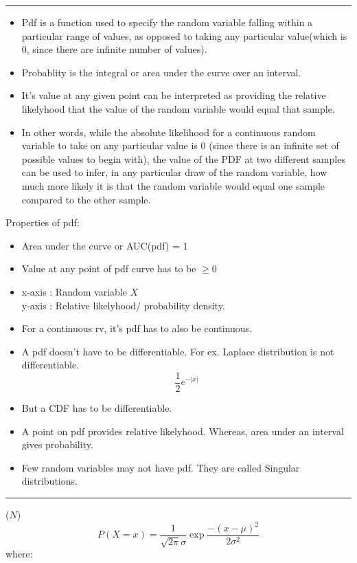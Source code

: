 \documentclass[	DIV=calc,%
paper=a4,%
fontsize=11pt,%
twocolumn]{scrartcl} %
\newcommand{\hformbar}[1]{\vspace{5pt}\hrule\vspace{10pt}} %
\newcommand{\formdesc}[1]{\noindent\textbf{#1}}
\begin{document}
\newpage
\hformbar
\formdesc{Probability Density Function (pdf):}
\begin{itemize}
	\item Pdf is a function used to specify the random variable falling within a particular range of values, as opposed to taking any particular value(which is 0, since there are infinite number of values).
	\item Probablity is the integral or area under the curve over an interval.
	\item It's value at any given point can be interpreted as providing the relative likelyhood that the value of the random variable would equal that sample.
	\item In other words, while the absolute likelihood for a continuous random variable to take on any particular value is 0 (since there is an infinite set of possible values to begin with), the value of the PDF at two different samples can be used to infer, in any particular draw of the random variable, how much more likely it is that the random variable would equal one sample compared to the other sample. 
\end{itemize}
Properties of pdf:
\begin{itemize}
	\item Area under the curve or AUC(pdf) = 1
	\item Value at any point of pdf curve has to be $\geq0$
	\item x-axis : Random variable $X$ \\ y-axis : Relative likelyhood/ probability density.
	\item For a continuous rv, it's pdf has to also be continuous.
	\item A pdf doesn't have to be differentiable. For ex. Laplace distribution is not differentiable. $$\frac{1}{2}e^{-|x|}$$
	\item But a CDF has to be differentiable.
	\item A point on pdf provides relative likelyhood. Whereas, area under an interval gives probability.
	\item Few random variables may not have pdf. They are called Singular distributions.
\end{itemize}

\newpage
\hformbar
\formdesc{Gaussian/ Normal Distribution:} ($N$)
\begin{equation}
	P(X=x) = \frac{1}{\sqrt{2\pi}\sigma} \exp{\frac{-(x-\mu)^2}{2\sigma^2}}
\end{equation}
where:
\end{document}
